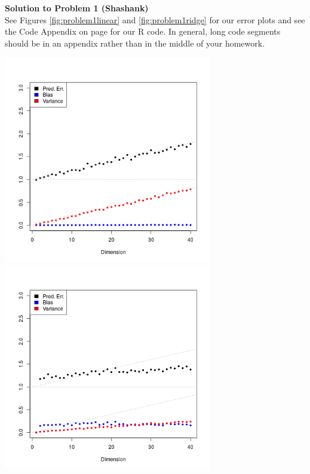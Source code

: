 \documentclass[11pt]{article}
\begin{document}
\begin{framed}
{\bf\large Solution to Problem 1 (Shashank)}\\
See Figures \ref{fig:problem1linear} and \ref{fig:problem1ridge} for our error
plots and see the Code Appendix on page \pageref{app:code} for our R code. In
general, long code segments should be in an appendix rather than in the middle
of your homework.
\begin{center}
  \includegraphics[width=0.68\textwidth]{linear}
\vspace{-5mm}
\label{fig:problem1linear}
  \includegraphics[width=0.68\textwidth]{ridge}
\vspace{-5mm}
\label{fig:problem1ridge}
\end{center}


\end{framed}
\end{document}
